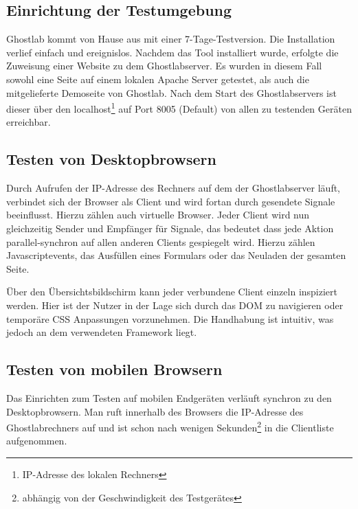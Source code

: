 		\subsection {Einrichtung der Testumgebung}
		Ghostlab kommt von Hause aus mit einer 7-Tage-Testversion. Die Installation verlief einfach und ereignislos. Nachdem das Tool installiert wurde, erfolgte die Zuweisung einer Website zu dem Ghostlabserver. Es wurden in diesem Fall sowohl eine Seite auf einem lokalen Apache Server getestet, als auch die mitgelieferte Demoseite von Ghostlab. Nach dem Start des Ghostlabservers ist dieser über den localhost\footnote{IP-Adresse des lokalen Rechners} auf Port 8005 (Default) von allen zu testenden Geräten erreichbar.
		
		\subsection{Testen von Desktopbrowsern}
		Durch Aufrufen der IP-Adresse des Rechners auf dem der Ghostlabserver läuft, verbindet sich der Browser als Client und wird fortan durch gesendete Signale beeinflusst. Hierzu zählen auch virtuelle Browser. Jeder Client wird nun gleichzeitig Sender und Empfänger für Signale, das bedeutet dass jede Aktion parallel-synchron auf allen anderen Clients gespiegelt wird. Hierzu zählen Javascriptevents, das Ausfüllen eines Formulars oder das Neuladen der gesamten Seite.
		
		Über den Übersichtsbildschirm kann jeder verbundene Client einzeln inspiziert werden. Hier ist der Nutzer in der Lage sich durch das DOM zu navigieren oder temporäre CSS Anpassungen vorzunehmen. Die Handhabung ist intuitiv, was jedoch an dem verwendeten Framework  liegt.
		
		\pagebreak
		\subsection{Testen von mobilen Browsern}
		
		Das Einrichten zum Testen auf mobilen Endgeräten verläuft synchron zu den Desktopbrowsern. Man ruft innerhalb des Browsers die IP-Adresse des Ghostlabrechners auf und ist schon nach wenigen Sekunden\footnote{abhängig von der Geschwindigkeit des Testgerätes} in die Clientliste aufgenommen.
		

